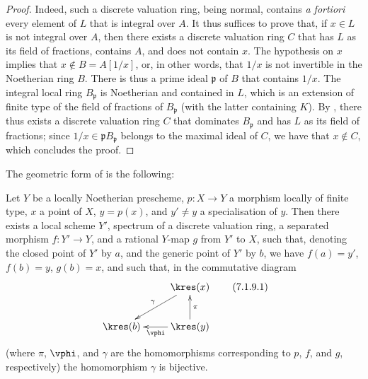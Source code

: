 \begin{proof}
Indeed, such a discrete valuation ring, being normal, contains \emph{a fortiori} every element of $L$ that is integral over $A$.
It thus suffices to prove that, if $x\in L$ is not integral over $A$, then there exists a discrete valuation ring $C$ that has $L$ as its field of fractions, contains $A$, and does not contain $x$.
The hypothesis on $x$ implies that $x\not\in B=A[1/x]$, or, in other words, that $1/x$ is not invertible in the Noetherian ring $B$.
There is thus a prime ideal $\mathfrak{p}$ of $B$ that contains $1/x$.
The integral local ring $B_\mathfrak{p}$ is Noetherian and contained in $L$, which is an extension of finite type of the field of fractions of $B_\mathfrak{p}$ (with the latter containing $K$).
By , there thus exists a discrete valuation ring $C$ that dominates $B_\mathfrak{p}$ and has $L$ as its field of fractions;
since $1/x\in\mathfrak{p}B_\mathfrak{p}$ belongs to the maximal ideal of $C$, we have that $x\not\in C$, which concludes the proof.
\end{proof}

The geometric form of  is the following:

\begin{proposition}[7.1.9]
\label{II.7.1.9}
Let $Y$ be a locally Noetherian prescheme, $p:X\to Y$ a morphism locally of finite type, $x$ a point of $X$, $y=p(x)$, and $y'\neq y$ a specialisation of $y$.
Then there exists a local scheme $Y'$, spectrum of a discrete valuation ring, a separated morphism $f:Y'\to Y$, and a rational $Y$-map $g$ from $Y'$ to $X$, such that, denoting the closed point of $Y'$ by $a$, and the generic point of $Y'$ by $b$, we have $f(a)=y'$, $f(b)=y$, $g(b)=x$, and such that, in the commutative diagram
\[
\label{II.7.1.9.1}
    \xymatrix{
        & \kres(x) \ar[dl]_{\gamma}
    \\  \kres(b)
        & \kres(y) \ar[u]_{\pi} \ar[l]^{\vphi}
    }
\tag{7.1.9.1}
\]
(where $\pi$, $\vphi$, and $\gamma$ are the homomorphisms corresponding to $p$, $f$, and $g$, respectively) the homomorphism $\gamma$ is bijective.
\end{proposition}

